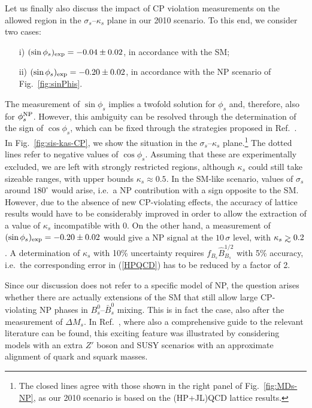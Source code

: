 \documentclass[11pt]{cernrep}
\newcommand{\gsim}{
\mathrel{\hbox{\rlap{\hbox{\lower4pt\hbox{$\sim$}}}\hbox{$>$}}}}
\begin{document}
Let us finally also discuss the impact of CP violation measurements 
on the allowed region in the $\sigma_s$--$\kappa_s$ plane in our 2010
scenario. To this end, we consider two cases:
\begin{itemize}
\item[i)] $(\sin\phi_s)_{\rm exp}=-0.04\pm0.02$, in accordance with the SM;
\item[ii)] $(\sin\phi_s)_{\rm exp}=-0.20\pm0.02$, in accordance with the NP 
scenario of Fig.~\ref{fig:sinPhis}.
\end{itemize}
The measurement of $\sin\phi_s$ implies a twofold solution for $\phi_s$
and, therefore, also for $\phi_s^{\rm NP}$. However, this ambiguity can 
be resolved through the determination of the sign of $\cos\phi_s$, which
can be fixed through the strategies proposed in Ref.~\cite{DFN}. In 
Fig.~\ref{fig:sis-kas-CP}, we show the situation in the
$\sigma_s$--$\kappa_s$ plane.\footnote{The closed lines agree with those
shown in the right panel of Fig.~\ref{fig:MDs-NP}, as our 2010
scenario is based on the (HP+JL)QCD lattice results.} The dotted lines refer to negative
values of $\cos\phi_s$. Assuming that these are experimentally excluded,
we are left with strongly restricted regions, although $\kappa_s$ could still
take sizeable ranges, with upper bounds $\kappa_s\approx0.5$.
In the SM-like scenario, values of $\sigma_s$ around
$180^\circ$ would arise, i.e.\ a NP contribution with a sign opposite to 
the SM. However, due to the absence of new CP-violating effects, 
the accuracy of lattice results would have to be considerably improved
in order to allow the extraction of a value of  $\kappa_s$ incompatible with 0.
On the other hand, a measurement of $(\sin\phi_s)_{\rm exp}=-0.20\pm0.02$
would give a NP signal at the $10\,\sigma$ level, with $\kappa_s\gsim0.2$.
A determination of  $\kappa_s$ with 10\% uncertainty requires 
$f_{B_s}\hat B_{B_s}^{1/2}$ with 5\% accuracy, i.e.\  the corresponding error 
in (\ref{HPQCD}) has to be reduced by a factor of 2.


Since our discussion  does not refer to a specific model of NP, the 
question arises whether there are actually extensions of the SM that still allow 
large CP-violating NP phases in $B^0_s$--$\bar B^0_s$ mixing. This is in
fact the case, also after the measurement of $\Delta M_s$. In Ref.~\cite{BF-DMs},
where also a comprehensive guide to the relevant literature can be found, 
this exciting feature was illustrated by considering models with an extra $Z'$ boson 
and SUSY scenarios with an approximate alignment of quark and squark masses.
\end{document}
